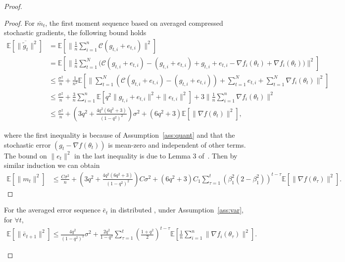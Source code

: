 \documentclass[11pt]{article}
\begin{document}
\begin{proof}
\begin{proof}
For $\bar m_t$, the first moment sequence based on averaged compressed stochastic gradients, the following bound holds
\begin{align*}
    \mathbb E[\|\overline{\tilde g_t}\|^2]&=\mathbb E[\|\frac{1}{n}\sum_{i=1}^n \mathcal C(g_{t,i}+e_{t,i})\|^2]\\
    &=\mathbb E[\|\frac{1}{n}\sum_{t=1}^N \big(\mathcal C(g_{t,i}+e_{t,i})-(g_{t,i}+e_{t,i})+g_{t,i}+e_{t,i}-\nabla f_i(\theta_t)+\nabla f_i(\theta_t)\big)\|^2]\\
    &\leq \frac{\sigma^2}{n}+\frac{1}{n^2}\mathbb E[\|\sum_{t=1}^N (\mathcal C(g_{t,i}+e_{t,i})-(g_{t,i}+e_{t,i}))+\sum_{t=1}^N e_{t,i}+\sum_{t=1}^N \nabla f_i(\theta_t)\|^2]\\
    &\leq \frac{\sigma^2}{n}+\frac{3}{n}\sum_{i=1}^n\mathbb E[q^2\|g_{t,i}+e_{t,i}\|^2+\|e_{t,i}\|^2]+3\|\frac{1}{n}\sum_{i=1}^n\nabla f_i(\theta_t)\|^2\\
    &\leq \frac{\sigma^2}{n}+(3q^2+\frac{4q^2(6q^2+3)}{(1-q^2)^2})\sigma^2+(6q^2+3)\mathbb E[\|\nabla f(\theta_t)\|^2],
\end{align*}


where the first inequality is because of Assumption~\ref{ass:quant} and that the stochastic error $(g_t-\nabla f(\theta_t))$ is mean-zero and independent of other terms. The bound on $\|e_t\|^2$ in the last inequality is due to Lemma 3 of~\cite{karimireddy2019error}. Then by similar induction we can obtain
\begin{align*}
    \mathbb E[\|m_t\|^2]&\leq \frac{C\sigma^2}{n}+(3q^2+\frac{4q^2(6q^2+3)}{(1-q^2)^2})C\sigma^2+(6q^2+3)C_1\sum_{\tau=1}^t (\beta_1^2(2-\beta_1^2))^{t-\tau}\mathbb E[\|\nabla f(\theta_\tau)\|^2].
\end{align*}
\end{proof}

\begin{Lemma} \label{lemma:bound e_t dist}
For the averaged error sequence $\bar e_t$ in distributed \algo, under Assumption~\ref{ass:var}, for $\forall t$,
\begin{align*}
    \mathbb E[\|\bar e_{t+1}\|^2]\leq \frac{4q^2}{(1-q^2)^2}\sigma^2+\frac{2q^2}{1-q^2}\sum_{\tau=1}^t (\frac{1+q^2}{2})^{t-\tau} \mathbb E[\frac{1}{n}\sum_{i=1}^n \|\nabla f_i(\theta_{\tau})\|^2].
\end{align*}
\end{Lemma}


\end{proof}
\end{document}
